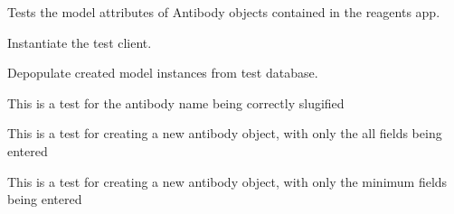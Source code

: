 \documentclass[letterpaper,10pt,english]{sphinxmanual}
\begin{document}
\begin{fulllineitems}
\label{api:experimentdb.reagents.tests.AntibodyModelTests}
Tests the model attributes of Antibody objects contained in the reagents app.

\begin{fulllineitems}
\label{api:experimentdb.reagents.tests.AntibodyModelTests.setUp}
Instantiate the test client.

\end{fulllineitems}


\begin{fulllineitems}
\label{api:experimentdb.reagents.tests.AntibodyModelTests.tearDown}
Depopulate created model instances from test database.

\end{fulllineitems}


\begin{fulllineitems}
\label{api:experimentdb.reagents.tests.AntibodyModelTests.test_antibody_slugify}
This is a test for the antibody name being correctly slugified

\end{fulllineitems}


\begin{fulllineitems}
\label{api:experimentdb.reagents.tests.AntibodyModelTests.test_create_antibody_all_fields}
This is a test for creating a new antibody object, with only the all fields being entered

\end{fulllineitems}


\begin{fulllineitems}
\label{api:experimentdb.reagents.tests.AntibodyModelTests.test_create_antibody_minimal}
This is a test for creating a new antibody object, with only the minimum fields being entered

\end{fulllineitems}


\end{fulllineitems}
\end{document}
